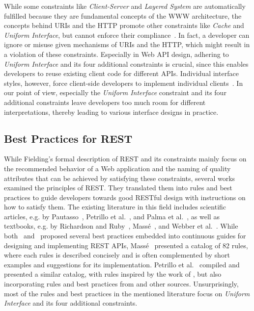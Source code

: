 \documentclass[runningheads]{llncs}
\begin{document}
While some constraints like \textit{Client-Server} and \textit{Layered System} are automatically fulfilled because they are fundamental concepts of the WWW architecture, the concepts behind URIs and the HTTP promote other constraints like \textit{Cache} and \textit{Uniform Interface}, but cannot enforce their compliance~\cite{conference:AModelDrivenApproachForRESTCompliantServices}. In fact, a developer can ignore or misuse given mechanisms of URIs and the HTTP, which might result in a violation of these constraints. Especially in Web API design, adhering to \textit{Uniform Interface} and its four additional constraints is crucial, since this enables developers to reuse existing client code for different APIs. Individual interface styles, however, force client-side developers to implement individual clients~\cite{Neumann2018}. In our point of view, especially the \textit{Uniform Interface} constraint and its four additional constraints leave developers too much room for different interpretations, thereby leading to various interface designs in practice. 

  
\subsection{Best Practices for REST}
\label{sec:bestPractices}
While Fielding's formal description of REST and its constraints mainly focus on the recommended behavior of a Web application and the naming of quality attributes that can be achieved by satisfying these constraints, several works examined the principles of REST. They translated them into rules and best practices to guide developers towards good RESTful design with instructions on how to satisfy them.
The existing literature in this field includes scientific articles, e.g. by Pautasso~\cite{Pautasso2014}, Petrillo et al.~\cite{conference:Petrillo2016}, and Palma et al.~\cite{article:DetectionOfRESTPatternsAndAntipatterns,article:Palma2017}, as well as textbooks, e.g. by Richardson and Ruby~\cite{book:RichardsonRuby:2007}, Massé~\cite{book:RestApiDesignRulebook2011}, and Webber et al.~\cite{book:RestInPractice:2010}. While both~\cite{book:RichardsonRuby:2007} and~\cite{book:RestInPractice:2010} proposed several best practices embedded into continuous guides for designing and implementing REST APIs, Massé~\cite{book:RestApiDesignRulebook2011} presented a catalog of 82 rules, where each rules is described concisely and is often complemented by short examples and suggestions for its implementation. Petrillo et al.~\cite{conference:Petrillo2016} compiled and presented a similar catalog, with rules inspired by the work of \cite{book:RestApiDesignRulebook2011}, but also incorporating rules and best practices from \cite{book:RichardsonRuby:2007} and other sources. 
Unsurprisingly, most of the rules and best practices in the mentioned literature focus on \textit{Uniform Interface} and its four additional constraints.
\end{document}
